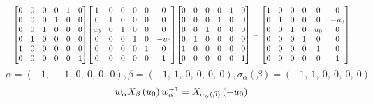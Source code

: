 \documentclass[11pt]{article}
\theoremstyle{definition}
\begin{document}
\[
\scaletoalign{\textwidth}{{\left[\begin{matrix}0 & 0 & 0 & 0 & 1 & 0\\0 & 0 & 0 & 1 & 0 & 0\\0 & 0 & 1 & 0 & 0 & 0\\0 & 1 & 0 & 0 & 0 & 0\\1 & 0 & 0 & 0 & 0 & 0\\0 & 0 & 0 & 0 & 0 & 1\end{matrix}\right]} {\left[\begin{matrix}1 & 0 & 0 & 0 & 0 & 0\\0 & 1 & 0 & 0 & 0 & 0\\u_{0} & 0 & 1 & 0 & 0 & 0\\0 & 0 & 0 & 1 & 0 & - u_{0}\\0 & 0 & 0 & 0 & 1 & 0\\0 & 0 & 0 & 0 & 0 & 1\end{matrix}\right]} {\left[\begin{matrix}0 & 0 & 0 & 0 & 1 & 0\\0 & 0 & 0 & 1 & 0 & 0\\0 & 0 & 1 & 0 & 0 & 0\\0 & 1 & 0 & 0 & 0 & 0\\1 & 0 & 0 & 0 & 0 & 0\\0 & 0 & 0 & 0 & 0 & 1\end{matrix}\right]} = {\left[\begin{matrix}1 & 0 & 0 & 0 & 0 & 0\\0 & 1 & 0 & 0 & 0 & - u_{0}\\0 & 0 & 1 & 0 & u_{0} & 0\\0 & 0 & 0 & 1 & 0 & 0\\0 & 0 & 0 & 0 & 1 & 0\\0 & 0 & 0 & 0 & 0 & 1\end{matrix}\right]}}
\]
\[
\alpha = \left( -1, \  -1, \  0, \  0, \  0, \  0\right), \beta = \left( -1, \  1, \  0, \  0, \  0, \  0\right), \sigma_{\alpha}(\beta) = \left( -1, \  1, \  0, \  0, \  0, \  0\right)
\]
\[
\scaletoalign{\textwidth}{w_{\alpha} X_{\beta}\left(u_{0}\right) w_{\alpha}^{-1} = X_{\sigma_{\alpha}\left(\beta\right)}\left(- u_{0}\right)}
\]
\end{document}
